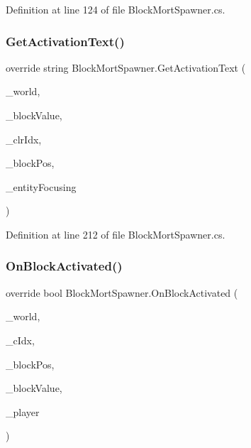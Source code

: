 Definition at line 124 of file Block\+Mort\+Spawner.\+cs.

\mbox{\label{class_block_mort_spawner_ad8831c79edb44b20149bf69b2b593fab}} 
\subsubsection{\texorpdfstring{GetActivationText()}{GetActivationText()}}
{\footnotesize\ttfamily override string Block\+Mort\+Spawner.\+Get\+Activation\+Text (\begin{DoxyParamCaption}\item[{World\+Base}]{\+\_\+world,  }\item[{Block\+Value}]{\+\_\+block\+Value,  }\item[{int}]{\+\_\+clr\+Idx,  }\item[{Vector3i}]{\+\_\+block\+Pos,  }\item[{Entity\+Alive}]{\+\_\+entity\+Focusing }\end{DoxyParamCaption})}



Definition at line 212 of file Block\+Mort\+Spawner.\+cs.

\mbox{\label{class_block_mort_spawner_aaa414a7485ae53fbfd501689d41f661d}} 
\subsubsection{\texorpdfstring{OnBlockActivated()}{OnBlockActivated()}}
{\footnotesize\ttfamily override bool Block\+Mort\+Spawner.\+On\+Block\+Activated (\begin{DoxyParamCaption}\item[{World\+Base}]{\+\_\+world,  }\item[{int}]{\+\_\+c\+Idx,  }\item[{Vector3i}]{\+\_\+block\+Pos,  }\item[{Block\+Value}]{\+\_\+block\+Value,  }\item[{Entity\+Alive}]{\+\_\+player }\end{DoxyParamCaption})}



